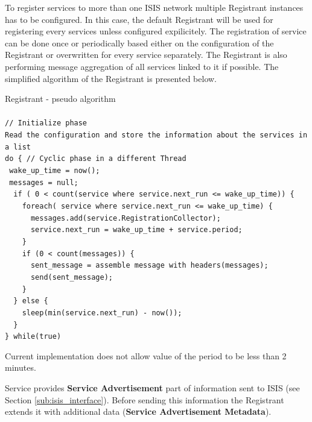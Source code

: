 \documentclass{book}
\begin{document}
To register services to more than one ISIS network multiple Registrant instances has to be configured. In this case, the default Registrant will be used for registering every services unless configured expilicitely.
The registration of service can be done once or periodically based either on the configuration of the Registrant or overwritten for every service separately. The Registrant is also performing message aggregation of all services linked to it if possible. The simplified algorithm of the Registrant is presented below.

\begin{framed}
  Registrant - pseudo algorithm\\
  \\
  \verb#// Initialize phase#\\
  \verb#Read the configuration and store the information about the services in a list#\\
  \verb#do { // Cyclic phase in a different Thread#\\
  \verb# wake_up_time = now();#\\
  \verb# messages = null;#\\
  \verb#  if ( 0 < count(service where service.next_run <= wake_up_time)) {#\\
  \verb#    foreach( service where service.next_run <= wake_up_time) {#\\
  \verb#      messages.add(service.RegistrationCollector);#\\
  \verb#      service.next_run = wake_up_time + service.period;#\\
  \verb#    }#\\
  \verb#    if (0 < count(messages)) {#\\
  \verb#      sent_message = assemble message with headers(messages);#\\
  \verb#      send(sent_message);#\\
  \verb#    }#\\
  \verb#  } else {#\\
  \verb#    sleep(min(service.next_run) - now()); #\\
  \verb#  }#\\
  \verb#} while(true)#\\
\end{framed}
Current implementation does not allow value of the period to be less than 2 minutes.

Service provides \textbf{Service Advertisement} part of information sent to ISIS (see Section \ref{sub:isis_interface}).
Before sending this information the Registrant extends it with additional data (\textbf{Service Advertisement Metadata}).
\end{document}
